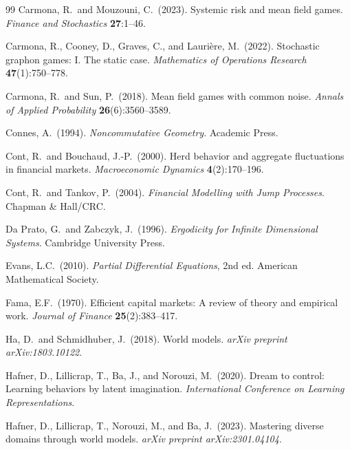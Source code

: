 \documentclass[12pt,a4paper]{article}
\theoremstyle{plain}
\theoremstyle{definition}
\newcommand{\1}{\mathbbm{1}}
\begin{document}
\begin{thebibliography}{99}
Carmona, R.\ and Mouzouni, C.\ (2023).
Systemic risk and mean field games.
\textit{Finance and Stochastics} \textbf{27}:1--46.

Carmona, R., Cooney, D., Graves, C., and Laurière, M.\ (2022).
Stochastic graphon games: I. The static case.
\textit{Mathematics of Operations Research} \textbf{47}(1):750--778.

Carmona, R.\ and Sun, P.\ (2018).
Mean field games with common noise.
\textit{Annals of Applied Probability} \textbf{26}(6):3560--3589.

Connes, A.\ (1994).
\textit{Noncommutative Geometry}.
Academic Press.

Cont, R.\ and Bouchaud, J.-P.\ (2000).
Herd behavior and aggregate fluctuations in financial markets.
\textit{Macroeconomic Dynamics} \textbf{4}(2):170--196.

Cont, R.\ and Tankov, P.\ (2004).
\textit{Financial Modelling with Jump Processes}.
Chapman \& Hall/CRC.

Da Prato, G.\ and Zabczyk, J.\ (1996).
\textit{Ergodicity for Infinite Dimensional Systems}.
Cambridge University Press.

Evans, L.C.\ (2010).
\textit{Partial Differential Equations}, 2nd ed.
American Mathematical Society.

Fama, E.F.\ (1970).
Efficient capital markets: A review of theory and empirical work.
\textit{Journal of Finance} \textbf{25}(2):383--417.

Ha, D.\ and Schmidhuber, J.\ (2018).
World models.
\textit{arXiv preprint arXiv:1803.10122}.

Hafner, D., Lillicrap, T., Ba, J., and Norouzi, M.\ (2020).
Dream to control: Learning behaviors by latent imagination.
\textit{International Conference on Learning Representations}.

Hafner, D., Lillicrap, T., Norouzi, M., and Ba, J.\ (2023).
Mastering diverse domains through world models.
\textit{arXiv preprint arXiv:2301.04104}.


\end{thebibliography}
\end{document}
